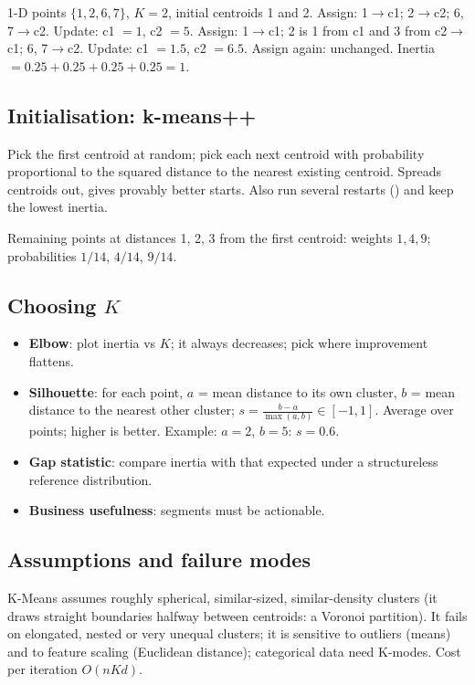 \begin{example}
1-D points $\{1, 2, 6, 7\}$, $K = 2$, initial centroids 1 and 2.
Assign: 1$\to$c1; 2$\to$c2; 6, 7$\to$c2. Update: c1 $=1$, c2 $= 5$.
Assign: 1$\to$c1; 2 is 1 from c1 and 3 from c2$\to$c1; 6, 7$\to$c2. Update: c1 $= 1.5$, c2 $= 6.5$.
Assign again: unchanged. Inertia $= 0.25 + 0.25 + 0.25 + 0.25 = 1$.
\end{example}

\subsection{Initialisation: k-means++}
Pick the first centroid at random; pick each next centroid with probability proportional to the squared distance to the nearest
existing centroid. Spreads centroids out, gives provably better starts. Also run several restarts () and keep the lowest
inertia.
\begin{example}
Remaining points at distances 1, 2, 3 from the first centroid: weights $1, 4, 9$; probabilities $1/14$, $4/14$, $9/14$.
\end{example}

\subsection{Choosing $K$}
\begin{itemize}
\item \textbf{Elbow}: plot inertia vs $K$; it always decreases; pick where improvement flattens.
\item \textbf{Silhouette}: for each point, $a$ = mean distance to its own cluster, $b$ = mean distance to the nearest other cluster;
  $s = \frac{b - a}{\max(a,b)}\in[-1,1]$. Average over points; higher is better. Example: $a = 2$, $b = 5$: $s = 0.6$.
\item \textbf{Gap statistic}: compare inertia with that expected under a structureless reference distribution.
\item \textbf{Business usefulness}: segments must be actionable.
\end{itemize}

\subsection{Assumptions and failure modes}
K-Means assumes roughly spherical, similar-sized, similar-density clusters (it draws straight boundaries halfway between centroids:
a Voronoi partition). It fails on elongated, nested or very unequal clusters; it is sensitive to outliers (means) and to feature scaling
(Euclidean distance); categorical data need K-modes. Cost per iteration $O(nKd)$.

